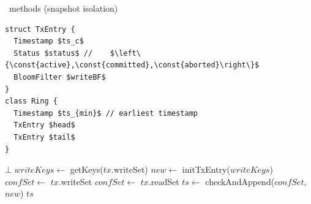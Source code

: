 \begin{algorithm} [t]
\small
\caption{\small \medserver\ methods (snapshot isolation)} \label{alg:medserver}
\begin{lstlisting}[mathescape]
struct TxEntry {
  Timestamp $ts_c$
  Status $status$ // 	$\left\{\const{active},\const{committed},\const{aborted}\right\}$
  BloomFilter $writeBF$
}
class Ring {
  Timestamp $ts_{min}$ // earliest timestamp
  TxEntry $head$
  TxEntry $tail$
}
\end{lstlisting}

\begin{algorithmic}[1]
\makeatletter\setcounter{ALG@line}{50}\makeatother
{}

	 \label{line:lessthanmin}
		\State \Return $\bot$  \label{line:tsonotok}
	\EndIf
	\State $writeKeys \gets $ getKeys($tx$.writeSet) \label{line:writeset}
	\State $new \gets $ initTxEntry($writeKeys$)
		\State $confSet \gets $ $tx$.writeSet   \label{line:tsowritekeys}
	\EndIf
		\State $confSet \gets $ $tx$.readSet  \label{line:tsoreadkeys}
	\EndIf 
\label{line:confkeys}
	\State $ts \gets $ checkAndAppend($confSet$, $new$) \label{line:append}
	\State \Return $ts$ 
\EndFunction





\end{algorithmic}
\end{algorithm}
